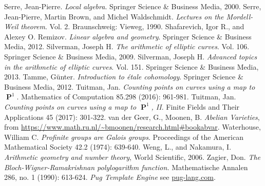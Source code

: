\documentclass[10pt,]{book}
\numberwithin{equation}{section}
\DeclareMathOperator{\PP}{\mathbf{P}}
\begin{document}
\begin{thebibliography}{9}
\hypertarget{bib-serre-local-alg}{}Serre, Jean-Pierre. \textit{Local algebra}. Springer Science \& Business Media, 2000.
\hypertarget{bib-serre-mordell-weil}{}Serre, Jean-Pierre, Martin Brown, and Michel Waldschmidt. \textit{Lectures on the Mordell-Weil theorem}. Vol. 2. Braunschweig: Vieweg, 1990.
\hypertarget{bib-shafarevich-remizov}{}Shafarevich, Igor R., and Alexey O. Remizov. \textit{Linear algebra and geometry}. Springer Science \& Business Media, 2012.
\hypertarget{bib-silverman}{}Silverman, Joseph H. \textit{The arithmetic of elliptic curves}. Vol. 106. Springer Science \& Business Media, 2009.
\hypertarget{bib-silverman-advanced}{}Silverman, Joseph H. \textit{Advanced topics in the arithmetic of elliptic curves}. Vol. 151. Springer Science \& Business Media, 2013.
\hypertarget{bib-tamme}{}Tamme, Günter. \textit{Introduction to étale cohomology}. Springer Science \& Business Media, 2012.
\hypertarget{bib-tuitman-map-to-p1-1}{}Tuitman, Jan. \textit{Counting points on curves using a map to \(\PP^1\)}. Mathematics of Computation 85.298 (2016): 961-981.
\hypertarget{bib-tuitman-map-to-p1-2}{}Tuitman, Jan. \textit{Counting points on curves using a map to \(\PP^1\), II}. Finite Fields and Their Applications 45 (2017): 301-322.
\hypertarget{bib-vandergeer-moonen}{}van der Geer, G., Moonen, B. \textit{Abelian Varieties}, from \url{https://www.math.ru.nl/\~bmoonen/research.html\#bookabvar}.
\hypertarget{bib-waterhouse}{}Waterhouse, William C.  \textit{Profinite groups are Galois groups}. Proceedings of the American Mathematical Society 42.2 (1974): 639-640.
\hypertarget{bib-weng-nakamura}{}Weng, L., and Nakamura, I. \textit{Arithmetic geometry and number theory}, World Scientific, 2006.
\hypertarget{bib-zag-ram}{}Zagier, Don.  \textit{The Bloch-Wigner-Ramakrishnan polylogarithm function.} Mathematische Annalen 286, no. 1 (1990): 613-624.
\hypertarget{bib-pug}{}\textit{Pug Template Engine} see \href{http://pug-lang.com/}{pug-lang.com}.
\end{thebibliography}
\end{document}

